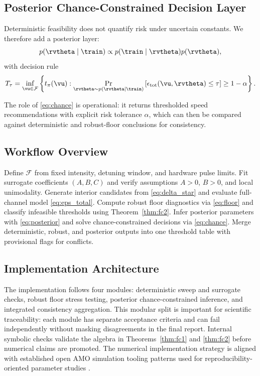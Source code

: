 \documentclass{article} %
\begin{document}
\subsection{Posterior Chance-Constrained Decision Layer}
Deterministic feasibility does not quantify risk under uncertain constants. We therefore add a posterior layer:
\begin{equation}
p(\rvtheta\mid \train)\propto p(\train\mid\rvtheta)p(\rvtheta),
\label{eq:posterior}
\end{equation}
with decision rule
\begin{equation}
T_{\tau}=\inf_{\vu\in\mathcal{F}}\left\{t_{\pi}(\vu):\Pr_{\rvtheta\sim p(\rvtheta\mid\train)}\left[\epsilon_{\mathrm{tot}}(\vu,\rvtheta)\le \tau\right]\ge 1-\alpha\right\}.
\label{eq:chance}
\end{equation}

The role of \eqref{eq:chance} is operational: it returns thresholded speed recommendations with explicit risk tolerance $\alpha$, which can then be compared against deterministic and robust-floor conclusions for consistency.

\subsection{Workflow Overview}
\begin{algorithm}[t]
\caption{Hybrid workflow for thresholded Yb Raman $X$-gate tradeoff synthesis.}
\label{alg:workflow}
\begin{algorithmic}
\STATE Define $\mathcal{F}$ from fixed intensity, detuning window, and hardware pulse limits.
\STATE Fit surrogate coefficients $(A,B,C)$ and verify assumptions $A>0$, $B>0$, and local unimodality.
\STATE Generate interior candidates from \eqref{eq:delta_star} and evaluate full-channel model \eqref{eq:eps_total}.
\STATE Compute robust floor diagnostics via \eqref{eq:floor} and classify infeasible thresholds using Theorem~\ref{thm:fc2}.
\STATE Infer posterior parameters with \eqref{eq:posterior} and solve chance-constrained decisions via \eqref{eq:chance}.
\STATE Merge deterministic, robust, and posterior outputs into one threshold table with provisional flags for conflicts.
\end{algorithmic}
\end{algorithm}

\subsection{Implementation Architecture}
The implementation follows four modules: deterministic sweep and surrogate checks, robust floor stress testing, posterior chance-constrained inference, and integrated consistency aggregation. This modular split is important for scientific traceability: each module has separate acceptance criteria and can fail independently without masking disagreements in the final report. Internal symbolic checks validate the algebra in Theorems~\ref{thm:fc1} and \ref{thm:fc2} before numerical claims are promoted. The numerical implementation strategy is aligned with established open AMO simulation tooling patterns used for reproducibility-oriented parameter studies \citep{S36}.
\end{document}
